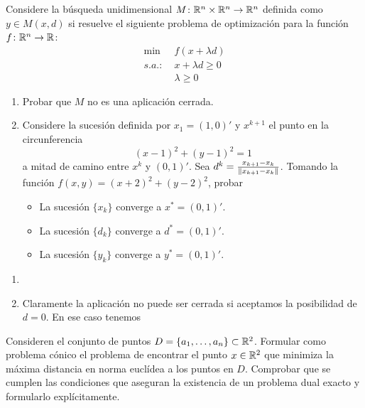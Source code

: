 \documentclass[twoside]{article}
\begin{document}
\begin{ejercicio}{5}
Considere la búsqueda unidimensional $M\colon\mathbb{R}^n\times\mathbb{R}^n\to\mathbb{R}^n$ definida como $y\in M(x,d)$ si resuelve el siguiente problema de optimización para la función $f\colon \mathbb{R}^n\to\mathbb{R}$:
\begin{align}
\min&\;f(x+\lambda d)\\
s.a.:&\;x+\lambda d\geq 0\\
&\;\lambda \geq  0
\end{align}
\begin{enumerate}
\item Probar que $M$ no es una aplicación cerrada.
\item Considere la sucesión definida por $x_1=(1,0)'$ y $x^{k+1}$ el punto en la circunferencia 
$$
(x-1)^2 + (y-1)^2 = 1
$$
a mitad de camino entre $x^k$ y $(0,1)'$. Sea $d^k=\frac{x_{k+1}-x_k}{\left\lVert x_{k+1}-x_k\right\rVert}$. Tomando la función $f(x,y)= (x+2)^2+(y-2)^2$, probar
\begin{itemize}
\item La sucesión $\{x_k\}$ converge a $x^*=(0,1)'$.
\item La sucesión $\{d_k\}$ converge a $d^*=(0,1)'$.
\item La sucesión $\{y_k\}$ converge a $y^*=(0,1)'$.
\end{itemize}
\end{enumerate}
\end{ejercicio}
\begin{solucion}
\begin{enumerate}
\item[]
\item Claramente la aplicación no puede ser cerrada si aceptamos la posibilidad de $d = 0$. En ese caso tenemos
\end{enumerate}
\end{solucion}
\newpage
\begin{ejercicio}{6}
Consideren el conjunto de puntos $D = \{a_1, \dotsc, a_n\} \subset \mathbb{R}^2$. Formular como problema cónico el problema de encontrar el punto $x \in \mathbb{R}^2$ que minimiza la máxima distancia en norma euclídea a los puntos en $D$. Comprobar que se cumplen las condiciones que aseguran la existencia de un problema dual exacto y formularlo explícitamente.
\end{ejercicio}
\end{document}
